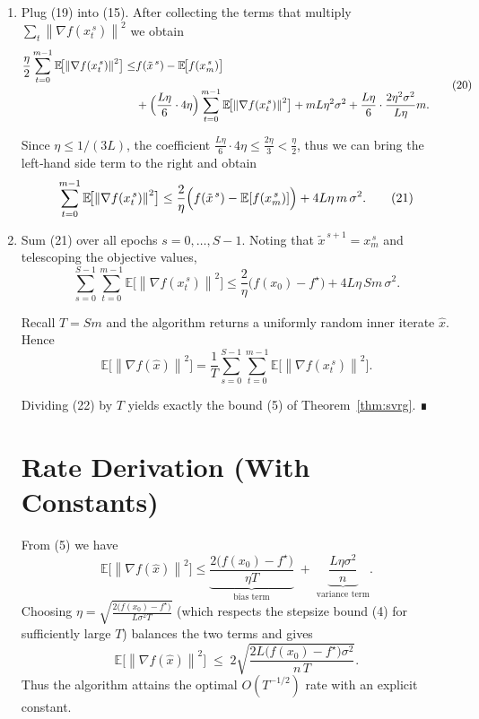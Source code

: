 \documentclass{article}
\newcommand{\E}{\mathbb{E}}
\newcommand{\norm}[1]{\left\|#1\right\|}
\newcommand{\grad}{\nabla}
\begin{document}
\begin{enumerate}
\item[Step 12.] Plug (19) into (15). After collecting the terms that multiply $\sum_{t}\norm{\grad f(x_t^{\,s})}^{2}$ we obtain
\[
\begin{aligned}
\frac{\eta}{2}\sum_{t=0}^{m-1}\E\!\bigl[\norm{\grad f(x_t^{\,s})}^{2}\bigr]
\le&
f(\tilde{x}^{\,s})-\E\!\bigl[f(x_{m}^{\,s})\bigr]  \\
&+\Bigl(\frac{L\eta}{6}\cdot 4\eta\Bigr)\sum_{t=0}^{m-1}\E\!\bigl[\norm{\grad f(x_t^{\,s})}^{2}\bigr]
+ mL\eta^{2}\sigma^{2}
+\frac{L\eta}{6}\cdot\frac{2\eta^{2}\sigma^{2}}{L\eta}m .
\end{aligned}
\tag{20}
\]

Since $\eta\le 1/(3L)$, the coefficient $\frac{L\eta}{6}\cdot4\eta\le \frac{2\eta}{3}<\frac{\eta}{2}$, thus we can bring the left‑hand side term to the right and obtain
\[
\sum_{t=0}^{m-1}\E\!\bigl[\norm{\grad f(x_t^{\,s})}^{2}\bigr]
\le
\frac{2}{\eta}\Bigl(f(\tilde{x}^{\,s})-\E[f(x_{m}^{\,s})]\Bigr)
+4L\eta\,m\,\sigma^{2}.
\tag{21}
\]

\item[Step 13.] Sum (21) over all epochs $s=0,\dots,S-1$. Noting that $\tilde{x}^{\,s+1}=x_{m}^{\,s}$ and telescoping the objective values,
\[
\sum_{s=0}^{S-1}\sum_{t=0}^{m-1}\E\!\bigl[\norm{\grad f(x_t^{\,s})}^{2}\bigr]
\le
\frac{2}{\eta}\bigl(f(x_0)-f^{\star}\bigr)
+4L\eta\,Sm\,\sigma^{2}.
\tag{22}
\]

Recall $T=Sm$ and the algorithm returns a uniformly random inner iterate $\widehat{x}$. Hence
\[
\E\!\bigl[\norm{\grad f(\widehat{x})}^{2}\bigr]
=\frac{1}{T}\sum_{s=0}^{S-1}\sum_{t=0}^{m-1}\E\!\bigl[\norm{\grad f(x_t^{\,s})}^{2}\bigr].
\tag{23}
\]

Dividing (22) by $T$ yields exactly the bound (5) of Theorem~\ref{thm:svrg}. ∎

\section*{Rate Derivation (With Constants)}
From (5) we have
\[
\E\!\bigl[\norm{\grad f(\widehat{x})}^{2}\bigr]
\le
\underbrace{\frac{2\bigl(f(x_0)-f^\star\bigr)}{\eta T}}_{\text{bias term}}
\;+\;
\underbrace{\frac{L\eta\sigma^{2}}{n}}_{\text{variance term}} .
\]
Choosing $\eta = \sqrt{\frac{2\bigl(f(x_0)-f^\star\bigr)}{L\sigma^{2}T}}$ (which respects the stepsize bound (4) for sufficiently large $T$) balances the two terms and gives
\[
\E\!\bigl[\norm{\grad f(\widehat{x})}^{2}\bigr]
\;\le\;
2\sqrt{\frac{2L\bigl(f(x_0)-f^\star\bigr)\sigma^{2}}{n\,T}} .
\]
Thus the algorithm attains the optimal $O(T^{-1/2})$ rate with an explicit constant.


\end{enumerate}
\end{document}
